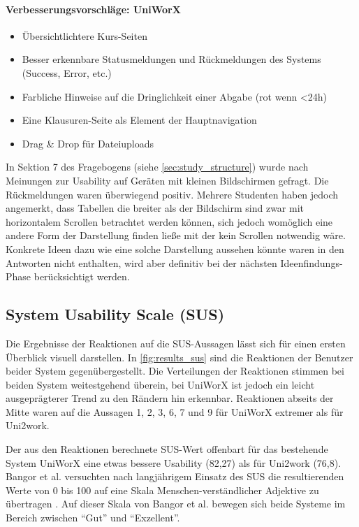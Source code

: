 \documentclass[11pt,a4paper,twoside,ngerman]{article}
\begin{document}
\paragraph{Verbesserungsvorschläge: \textbf{UniWorX}}
\begin{itemize}
    \item Übersichtlichtere Kurs-Seiten
    \item Besser erkennbare Statusmeldungen und Rückmeldungen des Systems (Success, Error, etc.)
    \item Farbliche Hinweise auf die Dringlichkeit einer Abgabe (rot wenn <24h)
    \item Eine Klausuren-Seite als Element der Hauptnavigation
    \item Drag & Drop für Dateiuploads
\end{itemize}

In Sektion 7 des Fragebogens (siehe \autoref{sec:study_structure}) wurde nach Meinungen zur Usability auf Geräten mit kleinen Bildschirmen gefragt. Die Rückmeldungen waren überwiegend positiv. Mehrere Studenten haben jedoch angemerkt, dass Tabellen die breiter als der Bildschirm sind zwar mit horizontalem Scrollen betrachtet werden können, sich jedoch womöglich eine andere Form der Darstellung finden ließe mit der kein Scrollen notwendig wäre. Konkrete Ideen dazu wie eine solche Darstellung aussehen könnte waren in den Antworten nicht enthalten, wird aber definitiv bei der nächsten Ideenfindungs-Phase berücksichtigt werden.

\subsection{System Usability Scale (SUS)} \label{sec:results_sus}
Die Ergebnisse der Reaktionen auf die SUS-Aussagen lässt sich für einen ersten Überblick visuell darstellen. In \autoref{fig:results_sus} sind die Reaktionen der Benutzer beider System gegenübergestellt. Die Verteilungen der Reaktionen stimmen bei beiden System weitestgehend überein, bei UniWorX ist jedoch ein leicht ausgeprägterer Trend zu den Rändern hin erkennbar. Reaktionen abseits der Mitte waren auf die Aussagen 1, 2, 3, 6, 7 und 9 für UniWorX extremer als für Uni2work.

Der aus den Reaktionen berechnete SUS-Wert offenbart für das bestehende System UniWorX eine etwas bessere Usability (82,27) als für Uni2work (76,8).
Bangor et al. versuchten nach langjährigem Einsatz des SUS die resultierenden Werte von 0 bis 100 auf eine Skala Menschen-verständlicher Adjektive zu übertragen \cite{bangor_sus_adjective}. Auf dieser Skala von Bangor et al. bewegen sich beide Systeme im Bereich zwischen "`Gut"' und "`Exzellent"'.
\end{document}
